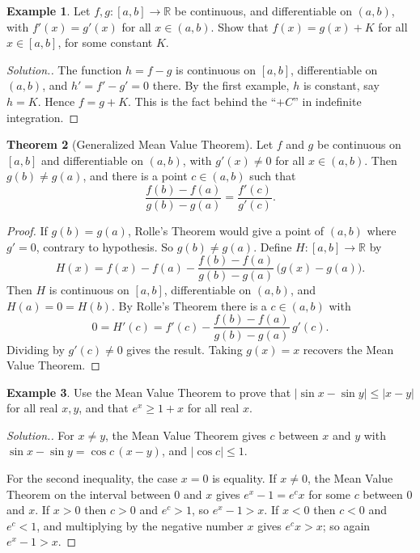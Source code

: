 \documentclass[11pt,a4paper]{article}
\numberwithin{equation}{section}
\theoremstyle{definition}
\newtheorem{thm}{Theorem}[subsection]
\newtheorem{exa}[thm]{Example}
\newenvironment{solution}
  {\renewcommand{\qedsymbol}{}\begin{proof}[\textit{Solution}.]}
  {\end{proof}}
\begin{document}
\begin{exa}
Let $f, g: [a,b]\longrightarrow \mathbb{R}$ be continuous, and differentiable on $(a,b)$, with $f'(x) = g'(x)$ for all $x\in(a,b)$. Show that $f(x) = g(x) + K$ for all $x\in [a,b]$, for some constant $K$.
\end{exa}

\begin{solution}
The function $h = f - g$ is continuous on $[a,b]$, differentiable on $(a,b)$, and $h' = f' - g' = 0$ there. By the first example, $h$ is constant, say $h = K$. Hence $f = g + K$. This is the fact behind the ``$+C$'' in indefinite integration.
\end{solution}


\begin{thm}[Generalized Mean Value Theorem]
Let $f$ and $g$ be continuous on $[a,b]$ and differentiable on $(a,b)$, with $g'(x)\neq 0$ for all $x\in (a,b)$. Then $g(b)\neq g(a)$, and there is a point $c\in (a,b)$ such that
$$\frac{f(b)  - f(a)}{g(b) - g(a)} = \frac{f'(c)}{g'(c)} .$$
\end{thm}

\begin{proof}
If $g(b) = g(a)$, Rolle's Theorem would give a point of $(a,b)$ where $g' = 0$, contrary to hypothesis. So $g(b)\neq g(a)$. Define $H: [a,b]\longrightarrow \mathbb{R}$ by
$$H(x) = f(x) - f(a) - \frac{f(b) - f(a)}{g(b) - g(a)}\, \bigl(g(x) - g(a)\bigr).$$
Then $H$ is continuous on $[a,b]$, differentiable on $(a,b)$, and $H(a) = 0  = H(b)$. By Rolle's Theorem there is a $c\in(a,b)$ with
$$0 = H'(c) = f'(c) - \frac{f(b) - f(a)}{g(b) - g(a)}\, g'(c) .$$
Dividing by $g'(c)\neq0$ gives the result. Taking $g(x) = x$ recovers the Mean Value Theorem.
\end{proof}

\begin{exa}
Use the Mean Value Theorem to prove that $|\sin x - \sin y|\leq|x-y|$ for all real $x,y$, and that $e^x\geq 1+x$ for all real $x$.
\end{exa}

\begin{solution}
For $x\neq y$, the Mean Value Theorem gives $c$ between $x$ and $y$ with $\sin x - \sin y = \cos c\,(x-y)$, and $|\cos c|\leq1$.

For the second inequality, the case $x = 0$ is equality. If $x\neq 0$, the Mean Value Theorem on the interval between $0$ and $x$ gives $e^x - 1 = e^c x$ for some $c$ between $0$ and $x$. If $x>0$ then $c>0$ and $e^c>1$, so $e^x - 1>x$. If $x<0$ then $c<0$ and $e^c<1$, and multiplying by the negative number $x$ gives $e^cx>x$; so again $e^x - 1>x$.
\end{solution}
\end{document}
